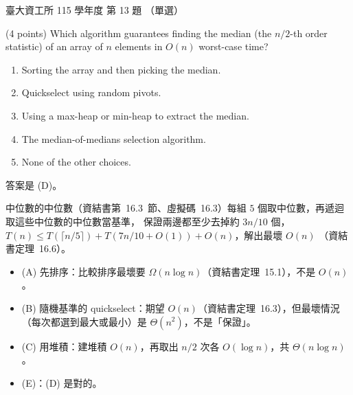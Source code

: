 \begin{pastexam}[label={px:ntu-115-dsa-13}]{臺大資工所 115 學年度 第 13 題}
（單選）

(4 points) Which algorithm guarantees finding the median (the $n/2$-th order statistic) of an array of $n$ elements in $O(n)$ worst-case time?


\begin{enumerate}[label=(\Alph*)]
\item Sorting the array and then picking the median.
\item Quickselect using random pivots.
\item Using a max-heap or min-heap to extract the median.
\item The median-of-medians selection algorithm.
\item None of the other choices.
\end{enumerate}
\end{pastexam}

\begin{pastsoln}
答案是 (D)。

中位數的中位數（資結書第~16.3~節、虛擬碼~16.3）每組 $5$ 個取中位數，再遞迴取這些中位數的中位數當基準，
保證兩邊都至少去掉約 $3n/10$ 個，$T(n) \le T(\lceil n/5 \rceil) + T(7n/10 + O(1)) + O(n)$，解出最壞 $O(n)$
（資結書定理~16.6）。
\begin{itemize}
\item (A) 先排序：比較排序最壞要 $\Omega(n \log n)$（資結書定理~15.1），不是 $O(n)$。
\item (B) 隨機基準的 quickselect：期望 $O(n)$（資結書定理~16.3），但最壞情況（每次都選到最大或最小）是
$\Theta(n^2)$，不是「保證」。
\item (C) 用堆積：建堆積 $O(n)$，再取出 $n/2$ 次各 $O(\log n)$，共 $\Theta(n \log n)$。
\item (E)：(D) 是對的。
\end{itemize}
\end{pastsoln}
